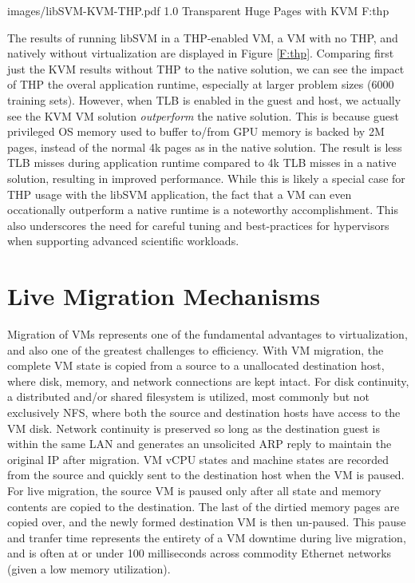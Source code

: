  {images/libSVM-KVM-THP.pdf}
  {1.0}
  {Transparent Huge Pages with KVM}
  {F:thp}


The results of running libSVM in a THP-enabled VM, a VM with no THP, and natively without virtualization are displayed in Figure \ref{F:thp}.  Comparing first just the KVM results without THP to the native solution, we can see the impact of THP the overal application runtime, especially at larger problem sizes (6000 training sets). However, when TLB is enabled in the guest and host, we actually see the KVM VM solution \emph{outperform} the native solution. This is because guest privileged OS memory used to buffer to/from GPU memory is backed by 2M pages, instead of the normal 4k pages as in the native solution. The result is less TLB misses during application runtime compared to 4k TLB misses in a native solution, resulting in improved performance.  While this is likely a special case for THP usage with the libSVM application, the fact that a VM can even occationally outperform a native runtime is a noteworthy accomplishment. This also underscores the need for careful tuning and best-practices for hypervisors when supporting advanced scientific workloads. 

\section{Live Migration Mechanisms}


Migration of VMs represents one of the fundamental advantages to virtualization, and also one of the greatest challenges to efficiency.  With VM migration, the complete VM state is copied from a source to a unallocated destination host, where disk, memory, and network connections are kept intact. For disk continuity, a distributed and/or shared filesystem is utilized, most commonly but not exclusively NFS, where both the source and destination hosts have access to the VM disk.  Network continuity is preserved so long as the destination guest is within the same LAN and generates an unsolicited ARP reply to maintain the original IP after migration.  VM vCPU states and machine states are recorded from the source and quickly sent to the destination host when the VM is paused. For live migration, the source VM is paused only after all state and memory contents are copied to the destination. The last of the dirtied memory pages are copied over, and the newly formed destination VM is then un-paused.  This pause and tranfer time represents the entirety of a VM downtime during live migration, and is often at or under 100 milliseconds across commodity Ethernet networks (given a low memory utilization).  

